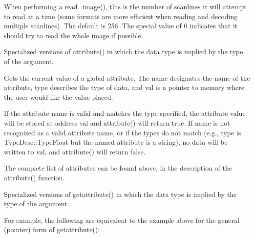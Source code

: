\vspace{10pt}
When performing a {\cf read_image()}, this is the number of scanlines it
will attempt to read at a time (some formats are more efficient when reading
and decoding multiple scanlines).  The default is 256.  The special value
of 0 indicates that it should try to read the whole image if possible.
\apiend

\apiend

Specialized versions of {\cf attribute()} in which the data type is
implied by the type of the argument.
\apiend




Gets the current value of a global attribute.  The {\cf name} designates
the name of the attribute, {\cf type} describes the type of data, and
{\cf val} is a pointer to memory where the user would like the value
placed.

If the attribute name is valid and matches the type specified, the
attribute value will be stored at address {\cf val} and {\cf
  attribute()} will return {\cf true}.  If {\cf name} is not recognized
as a valid attribute name, or if the types do not match (e.g., {\cf
  type} is {\cf TypeDesc::TypeFloat} but the named attribute is a
string), no data will be written to {\cf val}, and {\cf attribute()}
will return {\cf false}.

The complete list of attributes can be found above, in the description
of the {\cf attribute()} function.
\apiend

Specialized versions of {\cf getattribute()} in which the data type is
implied by the type of the argument.

For example, the following are equivalent to the example above for the
general (pointer) form of {\cf getattribute()}:

